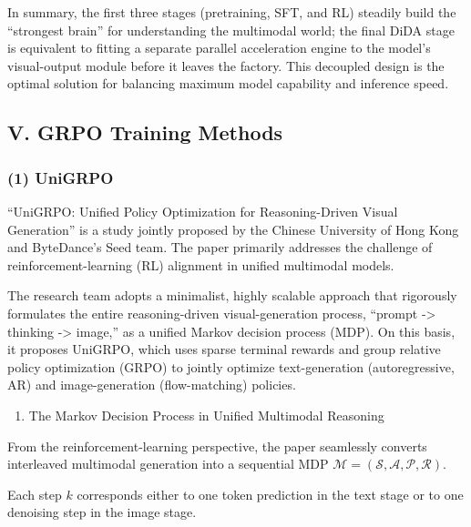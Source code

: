 In summary, the first three stages (pretraining, SFT, and RL) steadily build the ``strongest brain'' for understanding the multimodal world; the final DiDA stage is equivalent to fitting a separate parallel acceleration engine to the model's visual-output module before it leaves the factory. This decoupled design is the optimal solution for balancing maximum model capability and inference speed.

\hypertarget{v.-grpo-training-methods}{%
\subsection{V. GRPO Training Methods}\label{v.-grpo-training-methods}}

\hypertarget{unigrpo}{%
\subsubsection{(1) UniGRPO}\label{unigrpo}}

``UniGRPO: Unified Policy Optimization for Reasoning-Driven Visual Generation'' is a study jointly proposed by the Chinese University of Hong Kong and ByteDance's Seed team. The paper primarily addresses the challenge of reinforcement-learning (RL) alignment in unified multimodal models.

The research team adopts a minimalist, highly scalable approach that rigorously formulates the entire reasoning-driven visual-generation process, ``prompt -\textgreater{} thinking -\textgreater{} image,'' as a unified Markov decision process (MDP). On this basis, it proposes UniGRPO, which uses sparse terminal rewards and group relative policy optimization (GRPO) to jointly optimize text-generation (autoregressive, AR) and image-generation (flow-matching) policies.

\begin{enumerate}
\def\labelenumi{\arabic{enumi}.}
\tightlist
\item
  The Markov Decision Process in Unified Multimodal Reasoning
\end{enumerate}

From the reinforcement-learning perspective, the paper seamlessly converts interleaved multimodal generation into a sequential MDP \(\mathcal{M}=(\mathcal{S},\mathcal{A},\mathcal{P},\mathcal{R})\).

Each step \(k\) corresponds either to one token prediction in the text stage or to one denoising step in the image stage.

